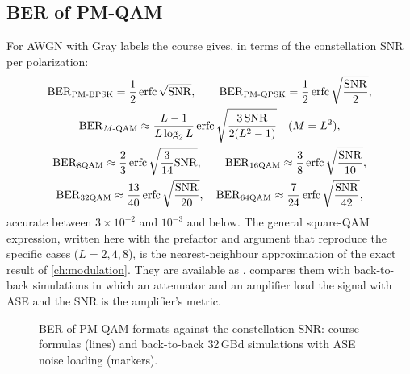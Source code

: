 \subsection{BER of PM-QAM}
For AWGN with Gray labels the course gives, in terms of the constellation SNR per polarization:
\begin{gather}
  \mathrm{BER}_{\mathrm{PM\text-BPSK}}=\frac12\operatorname{erfc}\sqrt{\mathrm{SNR}},\qquad
  \mathrm{BER}_{\mathrm{PM\text-QPSK}}=\frac12\operatorname{erfc}\sqrt{\frac{\mathrm{SNR}}2},\\
  \mathrm{BER}_{M\text-\mathrm{QAM}}\approx\frac{L-1}{L\log_2L}\operatorname{erfc}\sqrt{\frac{3\,\mathrm{SNR}}{2(L^2-1)}}\quad(M=L^2),\\
  \mathrm{BER}_{8\mathrm{QAM}}\approx\frac23\operatorname{erfc}\sqrt{\frac{3}{14}\mathrm{SNR}},\qquad
  \mathrm{BER}_{16\mathrm{QAM}}\approx\frac38\operatorname{erfc}\sqrt{\frac{\mathrm{SNR}}{10}},\\
  \mathrm{BER}_{32\mathrm{QAM}}\approx\frac{13}{40}\operatorname{erfc}\sqrt{\frac{\mathrm{SNR}}{20}},\quad
  \mathrm{BER}_{64\mathrm{QAM}}\approx\frac{7}{24}\operatorname{erfc}\sqrt{\frac{\mathrm{SNR}}{42}},
\end{gather}
accurate between $3\times10^{-2}$ and $10^{-3}$ and below. The general square-QAM expression, written here
with the prefactor and argument that reproduce the specific cases ($L=2,4,8$), is the
nearest-neighbour approximation of the exact result of \cref{ch:modulation}. They are available as
.  compares them with back-to-back simulations in which
an attenuator and an amplifier load the signal with ASE and the SNR is the amplifier's
 metric.

\begin{figure}[htbp]
\centering
{}
\caption{BER of PM-QAM formats against the constellation SNR: course formulas (lines) and back-to-back
32\,GBd simulations with ASE noise loading (markers).}
\label{fig:coherent-ber}
\end{figure}

